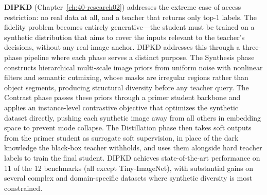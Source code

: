 \begin{foldable}
  \textbf{DIPKD} (Chapter~\ref{ch:40-research02}) addresses the extreme case of access restriction: no real data at all, and a teacher that returns only top-1 labels.
  The fidelity problem becomes entirely generative---the student must be trained on a synthetic distribution that aims to cover the inputs relevant to the teacher's decisions, without any real-image anchor.
  DIPKD addresses this through a three-phase pipeline where each phase serves a distinct purpose.
  The Synthesis phase constructs hierarchical multi-scale image priors from uniform noise with nonlinear filters and semantic cutmixing, whose masks are irregular regions rather than object segments, producing structural diversity before any teacher query.
  The Contrast phase passes these priors through a primer student backbone and applies an instance-level contrastive objective that optimizes the synthetic dataset directly, pushing each synthetic image away from all others in embedding space to prevent mode collapse.
  The Distillation phase then takes soft outputs from the primer student as surrogate soft supervision, in place of the dark knowledge the black-box teacher withholds, and uses them alongside hard teacher labels to train the final student.
  DIPKD achieves state-of-the-art performance on 11 of the 12 benchmarks (all except Tiny-ImageNet), with substantial gains on several complex and domain-specific datasets where synthetic diversity is most constrained.
\end{foldable}

